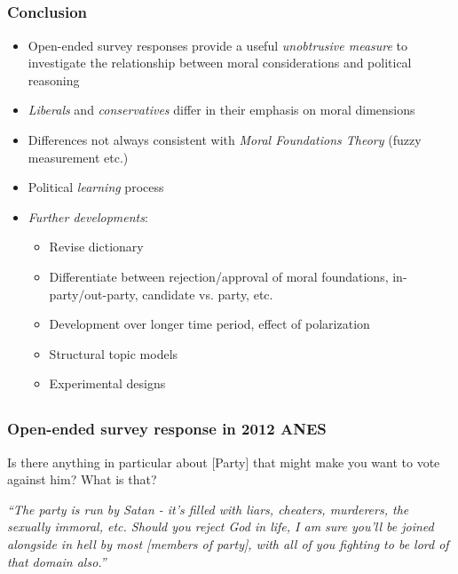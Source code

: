 \documentclass{beamer}
\begin{document}
\subsection{}
\begin{frame}%
  \frametitle{Conclusion}
  \begin{itemize}
\item Open-ended survey responses provide a useful \emph{unobtrusive measure} to investigate the relationship between moral considerations and political reasoning
\item \emph{Liberals} and \emph{conservatives} differ in their emphasis on moral dimensions
\item Differences not always consistent with \emph{Moral Foundations Theory} (fuzzy measurement etc.)
\item Political \emph{learning} process
\item \emph{Further developments}:
    \begin{itemize}
     \item Revise dictionary
     \item Differentiate between rejection/approval of moral foundations, in-party/out-party, candidate vs. party, etc.
     \item Development over longer time period, effect of polarization
     \item Structural topic models \citep{roberts2014structural}
     \item Experimental designs
    \end{itemize}
  \end{itemize}
\end{frame}

\subsection{}
\begin{frame}%
\frametitle{Open-ended survey response in 2012 ANES}
\begin{exampleblock}{Is there anything in particular about [Party] that might make you want to vote against him? What is that?}
  \begin{center}
    \textit{``The party is run by Satan - it's filled with liars, cheaters, murderers, the sexually immoral, etc. Should you reject God in life, I am sure you'll be joined alongside in hell by most [members of party], with all of you fighting to be lord of that domain also.''}
  \end{center}
\end{exampleblock}
\end{frame}
\end{document}
